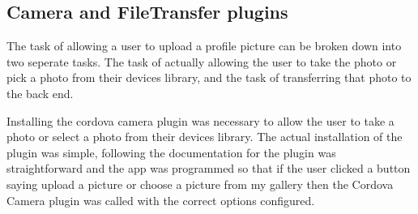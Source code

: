 \subsection{Camera and FileTransfer plugins}
The task of allowing a user to upload a profile picture can be broken down into two seperate tasks. The task of actually allowing the user to take the photo or pick a photo from their devices library, and the task of transferring that photo to the back end. 

Installing the cordova camera plugin \cite{cc} was necessary to allow the user to take a photo or select a photo from their devices library. The actual installation of the plugin was simple, following the documentation for the plugin was straightforward and the app was programmed so that if the user clicked a button saying upload a picture or choose a picture from my gallery then the Cordova Camera plugin was called with the correct options configured.

